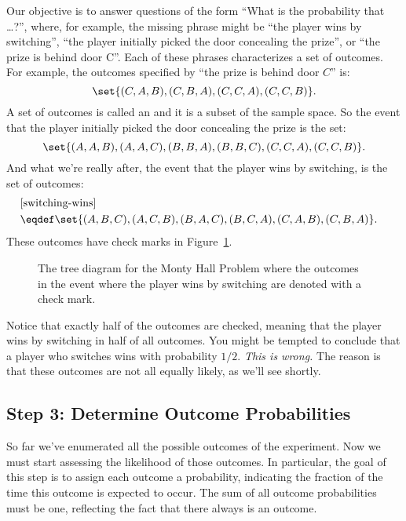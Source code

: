 Our objective is to answer questions of the form ``What is the
probability that \dots ?'', where, for example, the missing phrase
might be ``the player wins by switching'', ``the player initially
picked the door concealing the prize'', or ``the prize is behind door
C''.  Each of these phrases characterizes a set of outcomes. For
example, the outcomes specified by ``the prize is behind door $C$''
is:
%
\[
    \set{(C, A, B), (C, B, A), (C, C, A), (C, C, B)}.
\]
%
A set of outcomes is called an  and it is a subset of the
sample space.  So the event that the player initially picked the door
concealing the prize is the set:
%
\[
    \set{(A, A, B), (A, A, C), (B, B, A), (B, B, C), (C, C, A), (C, C, B)}.
\]
%
And what we're really after, the event that the player wins by
switching, is the set of outcomes:
\begin{align}
\lefteqn{[\text{switching-wins}]}\notag\\
   & \eqdef \set{(A, B, C), (A, C, B), (B, A, C),
  (B, C, A), (C, A, B), (C, B, A)}.\label{swwin-event}
\end{align}
These outcomes have check marks in Figure~\ref{fig:14A4}.
\begin{figure}


\caption{The tree diagram for the Monty Hall Problem where the
  outcomes in the event where the player wins by switching are denoted
  with a check mark.}

\label{fig:14A4}

\end{figure}

Notice that exactly half of the outcomes are checked, meaning that the
player wins by switching in half of all outcomes.  You might be
tempted to conclude that a player who switches wins with probability
$1/2$.  \emph{This is wrong.}  The reason is that these outcomes are
not all equally likely, as we'll see shortly.

\subsection{Step 3: Determine Outcome Probabilities}

So far we've enumerated all the possible outcomes of the experiment.  Now
we must start assessing the likelihood of those outcomes.  In particular,
the goal of this step is to assign each outcome a probability, indicating
the fraction of the time this outcome is expected to occur.  The sum of
all outcome probabilities must be one, reflecting the fact that there
always is an outcome.

